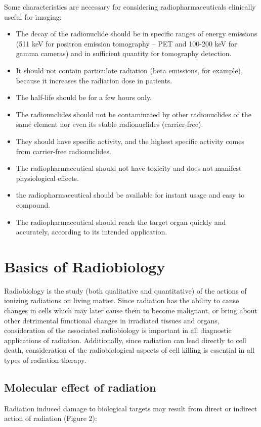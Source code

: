 \documentclass{article}
\begin{document}
Some characteristics are necessary for considering radiopharmaceuticals clinically useful for imaging: 
\begin{itemize}
    \item The decay of the radionuclide should be in specific ranges of energy emissions (511 keV for positron emission tomography – PET and 100-200 keV for gamma cameras) and in sufficient quantity for tomography detection.
    \item It should not contain particulate radiation (beta emissions, for example), because it increases the radiation dose in patients.
    \item The half-life should be for a few hours only.
    \item The radionuclides should not be contaminated by other radionuclides of the same element nor even its stable radionuclides (carrier-free).
    \item They should have specific activity, and the highest specific activity comes from carrier-free radionuclides.
    \item The radiopharmaceutical should not have toxicity and does not manifest physiological effects.
    \item the radiopharmaceutical should be available for instant usage and easy to compound.
    \item The radiopharmaceutical should reach the target organ quickly and accurately, according to its intended application.
    
\end{itemize}

\section*{Basics of Radiobiology}
Radiobiology is the study (both qualitative and quantitative) of the actions of ionizing radiations on living matter. Since radiation has the ability to cause changes in cells which may later cause them to become malignant, or bring about other detrimental functional changes in irradiated tissues and organs, consideration of the associated radiobiology is important in all diagnostic applications of radiation. Additionally, since radiation can lead directly to cell death, consideration of the radiobiological aspects of cell killing is essential in all types of radiation therapy.

\subsection*{Molecular effect of radiation}
Radiation induced damage to biological targets may result from direct or
indirect action of radiation (Figure 2):
\end{document}
